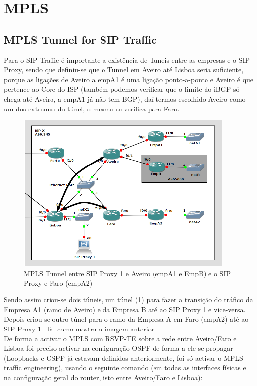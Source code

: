 \documentclass[11pt,a4paper]{report}
\begin{document}
\chapter{MPLS}

\section{MPLS Tunnel for SIP Traffic}

Para o SIP Traffic é importante a existência de Tuneis entre as empresas e o SIP Proxy, sendo que definiu-se que o Tunnel em Aveiro até Lisboa seria suficiente, porque as ligações de Aveiro a empA1 é uma ligação ponto-a-ponto e Aveiro é que pertence ao Core do ISP (também podemos verificar que o limite do iBGP só chega até Aveiro, a empA1 já não tem BGP), daí termos escolhido Aveiro como um dos extremos do túnel, o mesmo se verifica para Faro.\\

\begin{figure}[H]
\centerline{\includegraphics[width=300pt]{network_tunnel.png}}
\caption{MPLS Tunnel entre SIP Proxy 1 e Aveiro (empA1 e EmpB) e o SIP Proxy e Faro (empA2)}
\label{schema}
\end{figure}


Sendo assim criou-se dois túneis, um túnel (1) para fazer a transição do tráfico da Empresa A1 (ramo de Aveiro) e da Empresa B até ao SIP Proxy 1 e vice-versa. Depois criou-se outro túnel para o ramo da Empresa A em Faro (empA2) até ao SIP Proxy 1. Tal como mostra a imagem anterior.\\

De forma a activar o MPLS com RSVP-TE sobre a rede entre Aveiro/Faro e Lisboa foi preciso activar na configuração OSPF de forma a ele se propagar (Loopbacks e OSPF já estavam definidos anteriormente, foi só activar o MPLS traffic engineering), usando o seguinte comando (em todas as interfaces físicas e na configuração geral do router, isto entre Aveiro/Faro e Lisboa):\\
\end{document}
